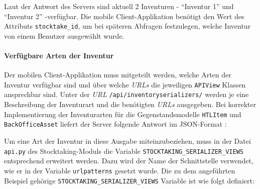 Laut der Antwort des Servers sind aktuell 2 Inventuren - ``Inventur 1''
und ``Inventur 2'' -verfügbar. Die mobile Client-Applikation benötigt
den Wert des Attributs \texttt{stocktake\_id}, um bei späteren Abfragen
festzulegen, welche Inventur von einem Benutzer ausgewählt wurde.

\hypertarget{verfuxfcgbare-arten-der-inventur}{%
\paragraph{Verfügbare Arten der
Inventur}\label{verfuxfcgbare-arten-der-inventur}}

Der mobilen Client-Applikation muss mitgeteilt werden, welche Arten der
Inventur verfügbar sind und über welche \emph{URLs}
 die jeweiligen
\texttt{APIView} Klassen ansprechbar sind. Unter der \emph{URL}
\texttt{/api/inventoryserializers/} werden je eine Beschreibung der
Inventurart und die benötigten \emph{URLs}
 ausgegeben. Bei
korrekter Implementierung der Inventurarten für die Gegenstandsmodelle
\texttt{HTLItem} und \texttt{BackOfficeAsset} liefert der Server
folgende Antwort im JSON-Format \cite{json-format-doku}:

\begin{Shaded}
\begin{Highlighting}[]
\FunctionTok{\{}
    \FunctionTok{:} \FunctionTok{\{}
        \FunctionTok{:} \FunctionTok{,}
        \FunctionTok{:} \FunctionTok{,}
        \FunctionTok{:} 
    \FunctionTok{\},}
    \FunctionTok{:} \FunctionTok{\{}
        \FunctionTok{:} \FunctionTok{,}
        \FunctionTok{:} \FunctionTok{,}
        \FunctionTok{:} 
    \FunctionTok{\}}
\FunctionTok{\}}
\end{Highlighting}
\end{Shaded}

Um eine Art der Inventur in diese Ausgabe miteinzubeziehen, muss in der
Datei \texttt{api.py} des Stocktaking-Moduls die Variable
\texttt{STOCKTAKING\_SERIALIZER\_VIEWS} entsprechend erweitert werden.
Dazu wird der Name der Schnittstelle verwendet, wie er in der Variable
\texttt{urlpatterns} gesetzt wurde. Die zu dem angeführten Beispiel
gehörige \texttt{STOCKTAKING\_SERIALIZER\_VIEWS} Variable ist wie folgt
definiert:

